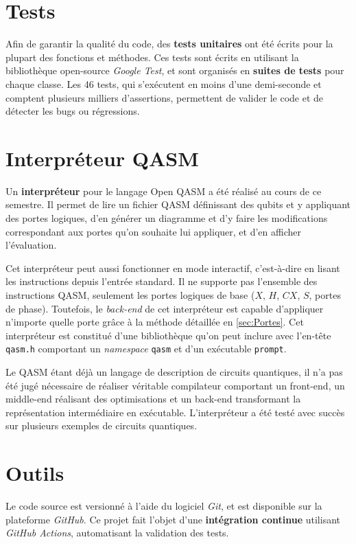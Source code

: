 \section{Tests}

Afin de garantir la qualité du code, des \textbf{tests unitaires} ont été écrits pour la plupart des fonctions et méthodes. Ces tests sont écrits en utilisant la bibliothèque open-source \textit{Google Test}, et sont organisés en \textbf{suites de tests} pour chaque classe. \cite{GoogleTest} Les 46 tests, qui s'exécutent en moins d'une demi-seconde et comptent plusieurs milliers d'assertions, permettent de valider le code et de détecter les bugs ou régressions.

\section{Interpréteur QASM}

Un \textbf{interpréteur} pour le langage Open QASM a été réalisé au cours de ce semestre. Il permet de lire un fichier QASM définissant des qubits et y appliquant des portes logiques, d'en générer un diagramme et d'y faire les modifications correspondant aux portes qu'on souhaite lui appliquer, et d'en afficher l'évaluation.

Cet interpréteur peut aussi fonctionner en mode interactif, c'est-à-dire en lisant les instructions depuis l'entrée standard. Il ne supporte pas l'ensemble des instructions QASM, seulement les portes logiques de base ($X$, $H$, $CX$, $S$, portes de phase). Toutefois, le \textit{back-end} de cet interpréteur est capable d'appliquer n'importe quelle porte grâce à la méthode détaillée en \autoref{sec:Portes}. Cet interpréteur est constitué d'une bibliothèque qu'on peut inclure avec l'en-tête \texttt{qasm.h} comportant un \textit{namespace} \texttt{qasm} et d'un exécutable \texttt{prompt}.

Le QASM étant déjà un langage de description de circuits quantiques, il n'a pas été jugé nécessaire de réaliser véritable compilateur comportant un front-end, un middle-end réalisant des optimisations et un back-end transformant la représentation intermédiaire en exécutable. L'interpréteur a été testé avec succès sur plusieurs exemples de circuits quantiques.

\section{Outils}

Le code source est versionné à l'aide du logiciel \textit{Git}, et est disponible sur la plateforme \textit{GitHub}. \cite{Git} \cite{GitHub} \cite{Leroy_2025} Ce projet fait l'objet d'une \textbf{intégration continue} utilisant \textit{GitHub Actions}, automatisant la validation des tests.

